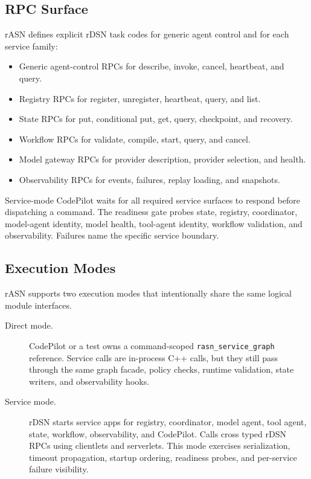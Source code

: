\documentclass[manuscript,screen,review]{acmart}
\newcommand{\rasn}{rASN\xspace}
\newcommand{\rdsn}{rDSN\xspace}
\newcommand{\codepilot}{CodePilot\xspace}
\begin{document}
\subsection{RPC Surface}

\rasn defines explicit \rdsn task codes for generic agent control and for each
service family:

\begin{itemize}
  \item Generic agent-control RPCs for describe, invoke, cancel, heartbeat, and
  query.
  \item Registry RPCs for register, unregister, heartbeat, query, and list.
  \item State RPCs for put, conditional put, get, query, checkpoint, and
  recovery.
  \item Workflow RPCs for validate, compile, start, query, and cancel.
  \item Model gateway RPCs for provider description, provider selection, and
  health.
  \item Observability RPCs for events, failures, replay loading, and snapshots.
\end{itemize}

Service-mode \codepilot waits for all required service surfaces to respond
before dispatching a command. The readiness gate probes state, registry,
coordinator, model-agent identity, model health, tool-agent identity, workflow
validation, and observability. Failures name the specific service boundary.

\subsection{Execution Modes}

\rasn supports two execution modes that intentionally share the same logical
module interfaces.

\begin{description}
  \item[Direct mode.] \codepilot or a test owns a command-scoped
  \texttt{rasn\_service\_graph} reference. Service calls are in-process C++
  calls, but they still pass through the same graph facade, policy checks,
  runtime validation, state writers, and observability hooks.
  \item[Service mode.] \rdsn starts service apps for registry, coordinator,
  model agent, tool agent, state, workflow, observability, and CodePilot. Calls
  cross typed \rdsn RPCs using clientlets and serverlets. This mode exercises
  serialization, timeout propagation, startup ordering, readiness probes, and
  per-service failure visibility.
\end{description}
\end{document}
